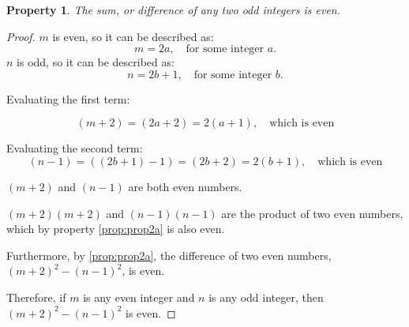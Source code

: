 \documentclass[11pt, letterpaper, includehead]{article}
\theoremstyle{plain}
\theoremstyle{mydefinition}
\theoremstyle{myproperty}
\newtheorem{prop}{Property}
\begin{document}
\begin{enumerate}[label=\textbf{\arabic*}., leftmargin=*]
\begin{prop}\label{prop:prop2b}
    The sum, or difference of any two odd integers is even.
\end{prop}
\begin{proof} 
    $m$ is even, so it can be described as:
    \[ m = 2a, \quad \text{for some integer } a. \]
    $n$ is odd, so it can be described as:
    \[n = 2b + 1, \quad \text{for some integer } b.\]

    Evaluating the first term:

    \[(m + 2) = (2a + 2) = 2(a + 1), \quad \text{which is even}\]

    Evaluating the second term:
    \[(n - 1) = ((2b + 1) - 1) = (2b + 2) = 2(b + 1), \quad \text{which is even}\]

    $(m + 2)$ and $(n - 1)$ are both even numbers.
    
    $(m + 2)(m + 2)$ and $(n - 1)(n - 1)$ are the product of two even numbers, which by property \ref{prop:prop2a} is also even.

    Furthermore, by \ref{prop:prop2a}, the difference of two even numbers, $(m + 2)^2 - (n - 1)^2$, is even.

    Therefore, if $m$ is any even integer and $n$ is any odd integer, then $(m + 2)^2 - (n - 1)^2$ is even.
\end{proof}


\end{enumerate}
\end{document}
